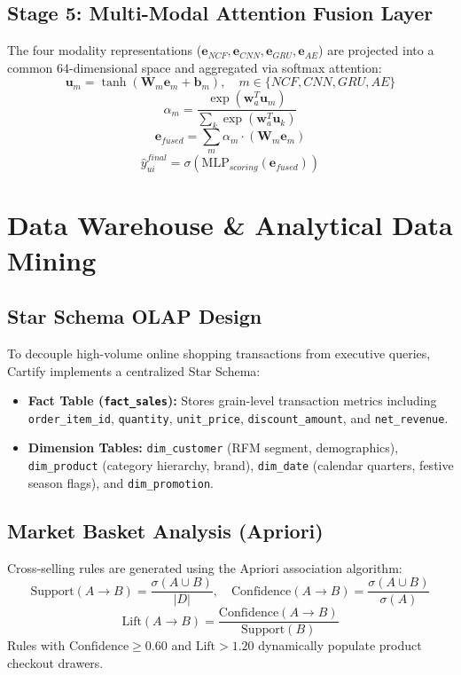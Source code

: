 \documentclass[conference]{IEEEtran}
\begin{document}
\subsection{Stage 5: Multi-Modal Attention Fusion Layer}
The four modality representations ($\mathbf{e}_{NCF}, \mathbf{e}_{CNN}, \mathbf{e}_{GRU}, \mathbf{e}_{AE}$) are projected into a common 64-dimensional space and aggregated via softmax attention:
\begin{equation}
\mathbf{u}_m = \tanh(\mathbf{W}_m \mathbf{e}_m + \mathbf{b}_m), \quad m \in \{NCF, CNN, GRU, AE\}
\end{equation}
\begin{equation}
\alpha_m = \frac{\exp(\mathbf{w}_a^T \mathbf{u}_m)}{\sum_{k} \exp(\mathbf{w}_a^T \mathbf{u}_k)}
\end{equation}
\begin{equation}
\mathbf{e}_{fused} = \sum_{m} \alpha_m \cdot (\mathbf{W}_m \mathbf{e}_m)
\end{equation}
\begin{equation}
\hat{y}_{ui}^{final} = \sigma \left( \text{MLP}_{scoring}(\mathbf{e}_{fused}) \right)
\end{equation}

\section{Data Warehouse \& Analytical Data Mining}
\subsection{Star Schema OLAP Design}
To decouple high-volume online shopping transactions from executive queries, Cartify implements a centralized Star Schema:
\begin{itemize}
    \item \textbf{Fact Table (\texttt{fact\_sales}):} Stores grain-level transaction metrics including \texttt{order\_item\_id}, \texttt{quantity}, \texttt{unit\_price}, \texttt{discount\_amount}, and \texttt{net\_revenue}.
    \item \textbf{Dimension Tables:} \texttt{dim\_customer} (RFM segment, demographics), \texttt{dim\_product} (category hierarchy, brand), \texttt{dim\_date} (calendar quarters, festive season flags), and \texttt{dim\_promotion}.
\end{itemize}

\subsection{Market Basket Analysis (Apriori)}
Cross-selling rules are generated using the Apriori association algorithm:
\begin{equation}
\text{Support}(A \rightarrow B) = \frac{\sigma(A \cup B)}{|D|}, \quad \text{Confidence}(A \rightarrow B) = \frac{\sigma(A \cup B)}{\sigma(A)}
\end{equation}
\begin{equation}
\text{Lift}(A \rightarrow B) = \frac{\text{Confidence}(A \rightarrow B)}{\text{Support}(B)}
\end{equation}
Rules with $\text{Confidence} \ge 0.60$ and $\text{Lift} > 1.20$ dynamically populate product checkout drawers.
\end{document}
